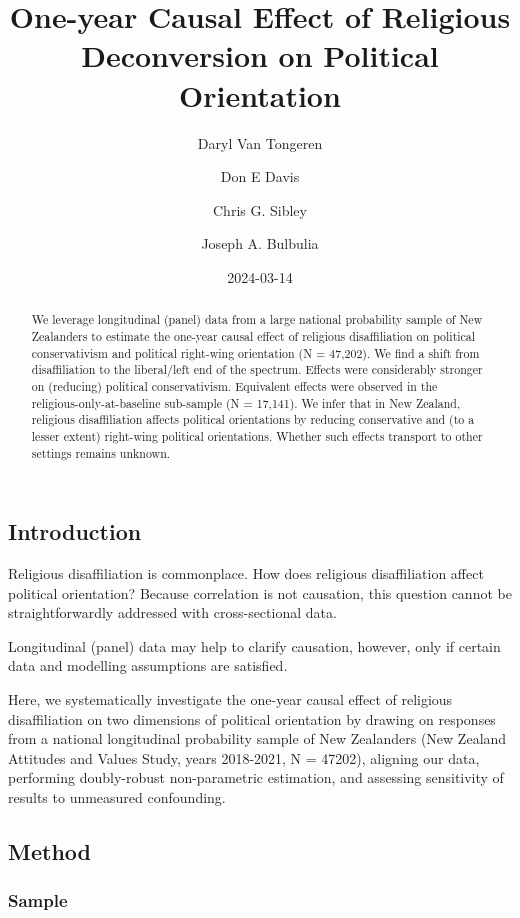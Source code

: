 \documentclass[
  singlecolumn]{article}
\title{One-year Causal Effect of Religious Deconversion on Political
Orientation}
\author{Daryl Van Tongeren \and Don E Davis \and Chris G.
Sibley \and Joseph A. Bulbulia}
\date{2024-03-14}
\begin{document}
\maketitle
\begin{abstract}
We leverage longitudinal (panel) data from a large national probability
sample of New Zealanders to estimate the one-year causal effect of
religious disaffiliation on political conservativism and political
right-wing orientation (N = 47,202). We find a shift from disaffiliation
to the liberal/left end of the spectrum. Effects were considerably
stronger on (reducing) political conservativism. Equivalent effects were
observed in the religious-only-at-baseline sub-sample (N = 17,141). We
infer that in New Zealand, religious disaffiliation affects political
orientations by reducing conservative and (to a lesser extent)
right-wing political orientations. Whether such effects transport to
other settings remains unknown.
\end{abstract}

\subsection{Introduction}\label{introduction}

Religious disaffiliation is commonplace. How does religious
disaffiliation affect political orientation? Because correlation is not
causation, this question cannot be straightforwardly addressed with
cross-sectional data.

Longitudinal (panel) data may help to clarify causation, however, only
if certain data and modelling assumptions are satisfied.

Here, we systematically investigate the one-year causal effect of
religious disaffiliation on two dimensions of political orientation by
drawing on responses from a national longitudinal probability sample of
New Zealanders (New Zealand Attitudes and Values Study, years 2018-2021,
N = 47202), aligning our data, performing doubly-robust non-parametric
estimation, and assessing sensitivity of results to unmeasured
confounding.

\subsection{Method}\label{method}

\subsubsection{Sample}\label{sample}
\end{document}
